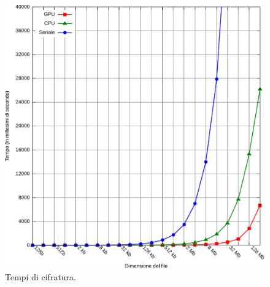\documentclass[12pt,a4paper,oneside]{book}
\begin{document}
\begin{figure}[p]
\begin{center}
\includegraphics[width=\textwidth]{img/test-encrypt}
\caption{Tempi di cifratura.\label{fig:test-encrypt}}
\end{center}
\end{figure}
\end{document}
